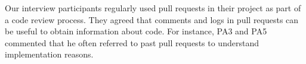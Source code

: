 Our interview participants regularly used pull requests in their project as part of a code review process.
They agreed that comments and logs in pull requests can be useful to obtain information about code. 
For instance, PA3 and PA5 commented that he often referred to past pull requests to understand implementation reasons.











